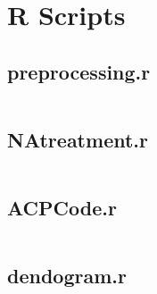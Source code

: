 

\section{R Scripts}%
\label{sec:r_scripts}

\newcommand{\mintedfile}[1]{
    \subsection{#1}%
    \label{sub:#1}
    \inputminted{r}{../../analysis/#1}
    \pagebreak
}


\mintedfile{preprocessing.r}
\mintedfile{NAtreatment.r}
\mintedfile{ACPCode.r}
\mintedfile{dendogram.r}
